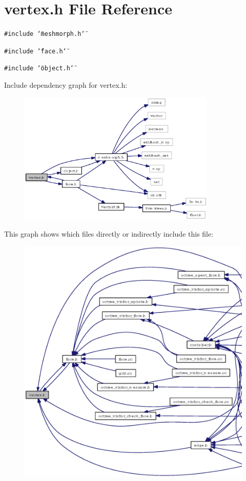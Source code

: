 \section{vertex.h File Reference}
\label{vertex_8h}
{\tt \#include \char`\"{}meshmorph.h\char`\"{}}\par
{\tt \#include \char`\"{}face.h\char`\"{}}\par
{\tt \#include \char`\"{}object.h\char`\"{}}\par


Include dependency graph for vertex.h:\begin{figure}[H]
\begin{center}
\leavevmode
\includegraphics[width=267pt]{vertex_8h__incl}
\end{center}
\end{figure}


This graph shows which files directly or indirectly include this file:\begin{figure}[H]
\begin{center}
\leavevmode
\includegraphics[width=367pt]{vertex_8h__dep__incl}
\end{center}
\end{figure}
